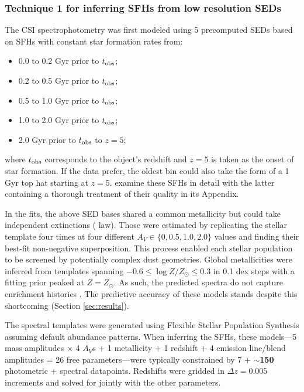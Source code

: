 \documentclass[a4paper,fleqn,usenatbib]{mnras}
\newcommand{\logZ}{\log Z/Z_{\odot}}
\newcommand{\bfr}{\bf\color{red}}
\newcommand{\tobs}{t_{\rm obs}}
\newcommand{\bitem}{\begin{itemize}}
\newcommand{\eitem}{\end{itemize}}
\begin{document}

\subsubsection{Technique 1 for inferring SFHs from low resolution SEDs}
\label{sec:blocks}

The CSI spectrophotometry was first modeled using 5 precomputed SEDs based on SFHs with 
constant star formation rates from:
\bitem
	\item 0.0 to 0.2 Gyr prior to $\tobs$;
	\item 0.2 to 0.5 Gyr prior to $\tobs$;
	\item 0.5 to 1.0 Gyr prior to $\tobs$;
	\item 1.0 to 2.0 Gyr prior to $\tobs$;
	\item 2.0 Gyr prior to $\tobs$ to $z=5$;
\eitem
where $\tobs$ corresponds to the object's redshift and $z=5$ is taken as the onset of star formation. If 
the data prefer, the oldest bin could also take the form of a 1 Gyr top hat starting at $z=5$. 
\citet{Dressler16, Dressler18} examine these SFHs in detail with the latter containing a thorough 
treatment of their quality in its Appendix.

In the fits, the above SED bases shared a common metallicity but could take independent extinctions 
(\citealt{Calzetti00} law). Those were estimated by replicating the stellar template four times
at four different {\bfr $A_{V}\in\{0,0.5,1.0,2.0\}$} values and finding their best-fit non-negative
superposition. This process enabled each stellar population to be screened by potentially complex dust
geometries. Global metallicities were inferred from templates spanning 
$-0.6\leq\logZ\leq0.3$ in 0.1 dex steps with a fitting prior peaked at $Z=Z_{\odot}$. 
As such, the predicted spectra do not capture enrichment 
histories \citep[cf.][]{Pacifici12, Morishita19}. The predictive accuracy of these models stands despite 
this shortcoming (Section \ref{sec:results}).

The spectral templates were generated using Flexible Stellar Population Synthesis 
\citep[FSPS;][]{ConroyGunnWhite09} assuming default abundance patterns. When inferring the SFHs, 
these models---5 mass amplitudes $\times$ 4 $A_{V}$s + 1 metallicity + 1 redshift + 4 emission line/blend 
amplitudes = 26 free parameters---were typically constrained by 
7 + {\bfr $\sim$150} photometric + spectral datapoints. Redshifts were gridded in $\Delta z = 0.005$ 
increments and solved for jointly with the other parameters.
\end{document}
